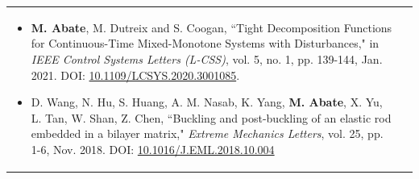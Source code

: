 \documentclass{article}
\begin{document}
\begin{tabular}{ m{6.9in} m{0in}}
\begin{itemize}
    \item[{[J2]}] \textbf{M. Abate}, M. Dutreix and S. Coogan, ``Tight Decomposition Functions for Continuous-Time Mixed-Monotone Systems with Disturbances," in \emph{IEEE Control Systems Letters (L-CSS)}, vol. 5, no. 1, pp. 139-144, Jan. 2021. DOI:  \href{https://doi.org/10.1109/LCSYS.2020.3001085}{10.1109/LCSYS.2020.3001085}. 
    \item[{[J1]}] D. Wang, N. Hu, S. Huang, A. M. Nasab, K. Yang, \textbf{M. Abate}, X. Yu, L. Tan, W. Shan, Z. Chen, ``Buckling and post-buckling of an elastic rod embedded in a bilayer matrix," \emph{Extreme Mechanics Letters}, vol. 25, pp. 1-6, Nov. 2018. DOI: \href{https://doi.org/10.1016/j.eml.2018.10.004}{10.1016/J.EML.2018.10.004}
\end{itemize}
\end{tabular}
\medskip
\end{document}
